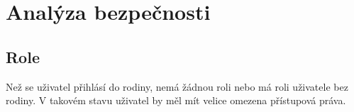             

\section{Analýza bezpečnosti}
    
    \subsection{Role}\label{analyza:bezpecnost:role}
    
        Než se uživatel přihlásí do rodiny, nemá žádnou roli nebo má roli uživatele bez rodiny. V takovém stavu uživatel by měl mít velice omezena přístupová práva. 
        
